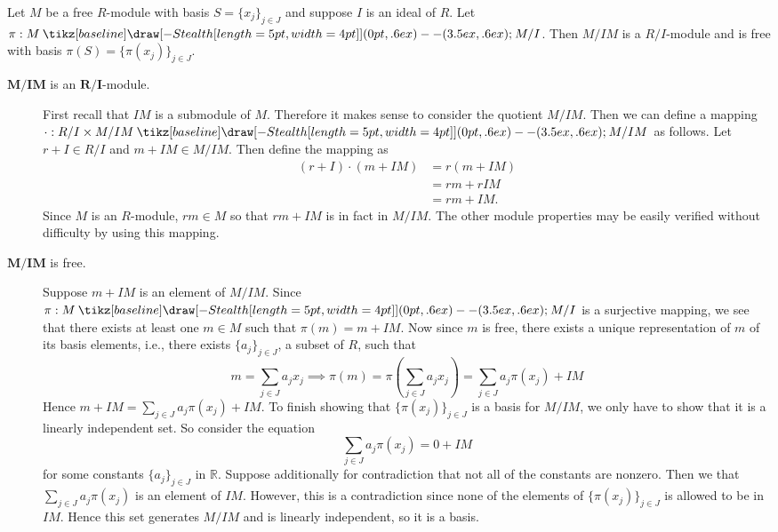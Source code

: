 \documentclass[12pt,letterpaper]{algebra_book}
\renewcommand{\to}{\mathbin{\tikz[baseline] \draw[-{Stealth[length=5pt,width=4pt]}] (0pt,.6ex) -- (3.5ex,.6ex);}}
\theoremstyle{definition}
\begin{document}
\begin{proposition}
    Let $M$ be a free $R$-module with basis $S = \{x_j\}_{j \in
    J}$ and suppose $I$ is an ideal of $R$. Let $\pi: M \to M/I$.
    Then
    $M/IM$ is a $R/I$-module and is free with basis $\pi(S) = 
    \{ \pi(x_j)\}_{j \in J}$.
\end{proposition}

\begin{prf}
    \begin{description}
        \item[$\bm{M/IM}$ is an $\bm{R/I}$-module.]
        First recall that $IM$ is a submodule of $M$. Therefore it
        makes sense to consider the quotient $M/IM$. Then we can
        define a mapping $\cdot: R/I \times M/IM \to M/IM$ as follows. Let $r
        + I \in R/I$ and $m + IM \in M/IM$. Then define the mapping as
        \begin{align*}
            (r + I)\cdot(m + IM) &= r(m + IM)\\
            &= rm + rIM\\
            &= rm + IM.
        \end{align*}
        Since $M$ is an $R$-module, $rm \in M$ so that $rm + IM$ is in
        fact in $M/IM$. The other module properties may be easily
        verified without difficulty by using this mapping. 

        \item[$\bm{M/IM}$ is free.] 
        Suppose $m+ IM$ is an element of $M/IM$. Since $\pi: M \to
        M/I$ is a surjective mapping, we see that there exists at
        least one $m \in M$ such that $\pi(m) = m + IM$. Now since
        $m$ is free, there exists a unique representation of $m$
        of its basis elements, i.e., there exists $\{a_j\}_{j \in
        J}$, a subset of $R$, such that 
        \[
            m = \sum_{j \in J} a_jx_j \implies  \pi(m) = \pi\left(\sum_{j \in J} a_jx_j \right) =
            \sum_{j \in J} a_j\pi(x_j) + IM
        \]
        Hence $m + IM = \sum_{j \in J} a_j\pi(x_j) + IM.$ To finish showing
        that $\{\pi(x_j)\}_{j \in J}$ is a basis for $M/IM$, we
        only have to show that it is a linearly independent
        set. So consider the equation 
        \[
            \sum_{j \in J}a_j\pi(x_j) = 0 + IM                
        \]
        for some constants $\{a_j\}_{j \in J}$ in $\mathbb{R}$.
        Suppose additionally for contradiction that not all of the
        constants are nonzero. Then we that $\sum_{j \in
        J}a_j\pi(x_j)$ is an element of $IM$. However, this is a
        contradiction since none of the elements of
        $\{\pi(x_j)\}_{j \in J}$ is allowed to be in $IM$. Hence
        this set generates $M/IM$ and is linearly independent, so
        it is a basis.
    \end{description}
\end{prf}
\end{document}
